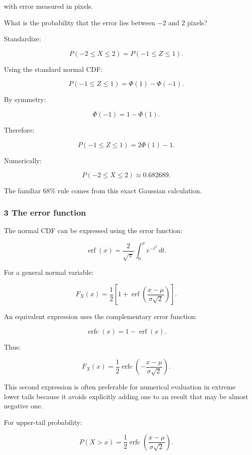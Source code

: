 with error measured in pixels.

What is the probability that the error lies between \(-2\) and \(2\) pixels?

Standardize:

\[
 P(-2\le X\le2) = P\left(-1\le Z\le1\right).
\]

Using the standard normal CDF:

\[
 P(-1\le Z\le1) = \Phi(1)-\Phi(-1).
\]

By symmetry:

\[
 \Phi(-1)=1-\Phi(1).
\]

Therefore:

\[
 P(-1\le Z\le1) = 2\Phi(1)-1.
\]

Numerically:

\[
 \boxed{P(-2\le X\le2)\approx0.682689}.
\]

The familiar 68\% rule comes from this exact Gaussian calculation.

\subsubsection{3 The error function}\label{02-foundations-ii-ch023-the-error-function}

\hypertarget{02-foundations-ii-ch023-the-error-function}{}

The normal CDF can be expressed using the error function:

\[
 \operatorname{erf}(x)= \frac2{\sqrt\pi} \int_0^xe^{-t^2}\,dt.
\]

For a general normal variable:

\[
 \boxed{ F_X(x) = \frac12\left[ 1+\operatorname{erf} \left(\frac{x-\mu}{\sigma\sqrt2}\right) \right] }.
\]

An equivalent expression uses the complementary error function:

\[
 \operatorname{erfc}(x)=1-\operatorname{erf}(x).
\]

Thus:

\[
 \boxed{ F_X(x) = \frac12\operatorname{erfc} \left( -\frac{x-\mu}{\sigma\sqrt2} \right) }.
\]

This second expression is often preferable for numerical evaluation in extreme lower tails because it avoids explicitly adding one to an  result that may be almost negative one.

For upper-tail probability:

\[
 P(X>x) = \frac12\operatorname{erfc} \left( \frac{x-\mu}{\sigma\sqrt2} \right).
\]


